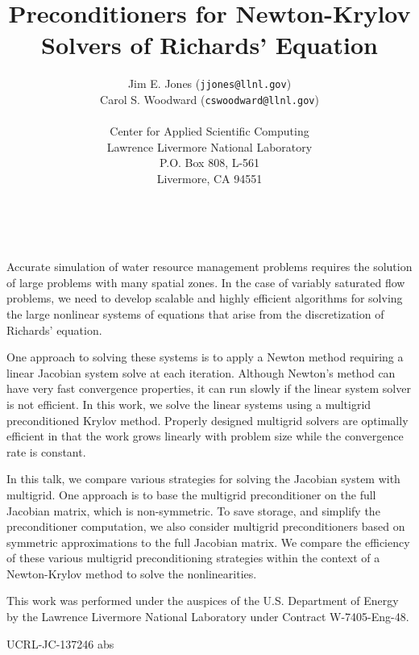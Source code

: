 \documentclass[11pt]{article}
\date{ ~ \hspace{-4mm}}
\title{Preconditioners for Newton-Krylov Solvers of Richards' Equation  }
\author{Jim E. Jones ({\tt jjones@llnl.gov}) \\ Carol S. Woodward ({\tt cswoodward@llnl.gov}) \\ \\ Center for Applied Scientific Computing \\ Lawrence Livermore National Laboratory \\ P.O. Box 808, L-561 \\ Livermore, CA 94551}
\begin{document}
\maketitle
\thispagestyle{empty}





 



Accurate simulation of water resource management problems
requires the solution of large problems with many spatial zones.
In the case of variably saturated flow problems, we need to
develop scalable and highly efficient algorithms for solving
the large nonlinear systems of equations that arise from the
discretization of Richards' equation.
 \newline 

One approach to solving these systems is to apply a Newton method
requiring a linear Jacobian system solve at each iteration.  Although
Newton's method can have very fast convergence properties, it can
run slowly if the linear system solver is not efficient.
In this work, we solve the linear systems using a multigrid
preconditioned Krylov method. Properly designed multigrid solvers
are optimally efficient in that the work grows linearly with problem
size while the convergence rate is constant.
 \newline 

In this talk, we compare various strategies for solving the
Jacobian system with multigrid. One approach is to base the
multigrid preconditioner on the full Jacobian matrix, which
is non-symmetric. To save storage, and simplify the preconditioner
computation, we also consider multigrid preconditioners based
on symmetric approximations to the full Jacobian matrix.
We compare the efficiency of these various multigrid preconditioning
strategies within the context of
a Newton-Krylov method to solve the nonlinearities.
 \newline 

This work was performed under the
auspices of the U.S. Department of Energy by the
Lawrence Livermore National Laboratory under Contract W-7405-Eng-48.
 \newline 

UCRL-JC-137246 abs
\end{document}
